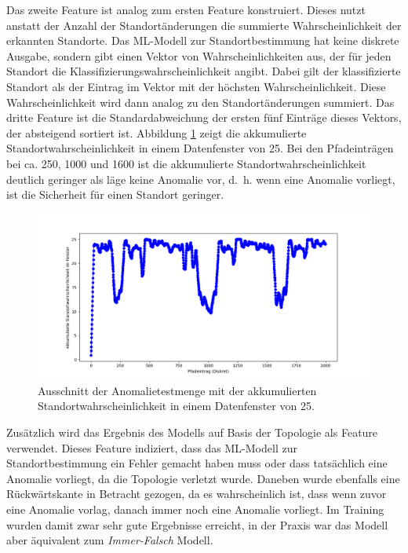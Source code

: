 Das zweite Feature ist analog zum ersten Feature konstruiert.
Dieses nutzt anstatt der Anzahl der Standortänderungen die summierte Wahrscheinlichkeit der erkannten Standorte.
Das ML-Modell zur Standortbestimmung hat keine diskrete Ausgabe, sondern gibt einen Vektor von Wahrscheinlichkeiten aus,
der für jeden Standort die Klassifizierungswahrscheinlichkeit angibt.
Dabei gilt der klassifizierte Standort als der Eintrag im Vektor mit der höchsten Wahrscheinlichkeit.
Diese Wahrscheinlichkeit wird dann analog zu den Standortänderungen summiert.
Das dritte Feature ist die Standardabweichung der ersten fünf Einträge dieses Vektors, der absteigend sortiert ist.
Abbildung \ref{fig:window_confidence} zeigt die akkumulierte Standortwahrscheinlichkeit in einem Datenfenster von 25.
Bei den Pfadeinträgen bei ca. 250, 1000 und 1600 ist die akkumulierte Standortwahrscheinlichkeit deutlich geringer als läge keine Anomalie vor,
d.~h. wenn eine Anomalie vorliegt, ist die Sicherheit für einen Standort geringer.
\begin{figure}[h!]
    \centering
    \includegraphics[width=\linewidth]{images/feature_window_confidence.png}
    \caption{Ausschnitt der Anomalietestmenge mit der akkumulierten Standortwahrscheinlichkeit in einem Datenfenster von 25.}
    \label{fig:window_confidence}
\end{figure}
\newline
\newline
Zusätzlich wird das Ergebnis des Modells auf Basis der Topologie als Feature verwendet.
Dieses Feature indiziert, dass das ML-Modell zur Standortbestimmung ein Fehler gemacht haben muss
oder dass tatsächlich eine Anomalie vorliegt, da die Topologie verletzt wurde.
\newline
\newline
Daneben wurde ebenfalls eine Rückwärtskante in Betracht gezogen,
da es wahrscheinlich ist, dass wenn zuvor eine Anomalie vorlag, danach immer noch eine Anomalie vorliegt.
Im Training wurden damit zwar sehr gute Ergebnisse erreicht,
in der Praxis war das Modell aber äquivalent zum \textit{Immer-Falsch} Modell.
